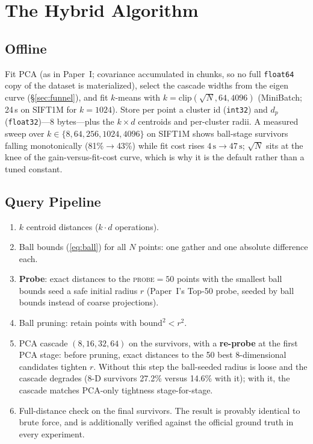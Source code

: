 \documentclass[sigconf,nonacm]{acmart}
\begin{document}
\section{The Hybrid Algorithm}
\label{sec:algorithm}

\subsection{Offline}

Fit PCA (as in Paper~I; covariance accumulated in chunks, so no full
\texttt{float64} copy of the dataset is materialized), select the cascade
widths from the eigen curve (\S\ref{sec:funnel}), and fit $k$-means with
$k = \mathrm{clip}(\sqrt{N}, 64, 4096)$ (MiniBatch; 24\,s on SIFT1M for
$k{=}1024$). Store per point a cluster id (\texttt{int32}) and $d_p$
(\texttt{float32})---8 bytes---plus the $k \times d$ centroids and
per-cluster radii. A measured sweep over $k \in \{8, 64, 256, 1024, 4096\}$
on SIFT1M shows ball-stage survivors falling monotonically
(81\%$\to$43\%) while fit cost rises $4\,\mathrm{s} \to 47\,\mathrm{s}$;
$\sqrt{N}$ sits at the knee of the gain-versus-fit-cost curve, which is why
it is the default rather than a tuned constant.

\subsection{Query Pipeline}

\begin{enumerate}
\item $k$ centroid distances ($k \cdot d$ operations).
\item Ball bounds (\ref{eq:ball}) for all $N$ points: one gather and one
  absolute difference each.
\item \textbf{Probe}: exact distances to the \textsc{probe}$=50$ points with
  the smallest ball bounds seed a safe initial radius $r$ (Paper~I's Top-50
  probe, seeded by ball bounds instead of coarse projections).
\item Ball pruning: retain points with $\mathrm{bound}^2 < r^2$.
\item PCA cascade $(8,16,32,64)$ on the survivors, with a \textbf{re-probe}
  at the first PCA stage: before pruning, exact distances to the 50 best
  8-dimensional candidates tighten $r$. Without this step the ball-seeded
  radius is loose and the cascade degrades (8-D survivors 27.2\% versus
  14.6\% with it); with it, the cascade matches PCA-only tightness
  stage-for-stage.
\item Full-distance check on the final survivors. The result is provably
  identical to brute force, and is additionally verified against the
  official ground truth in every experiment.
\end{enumerate}
\end{document}

